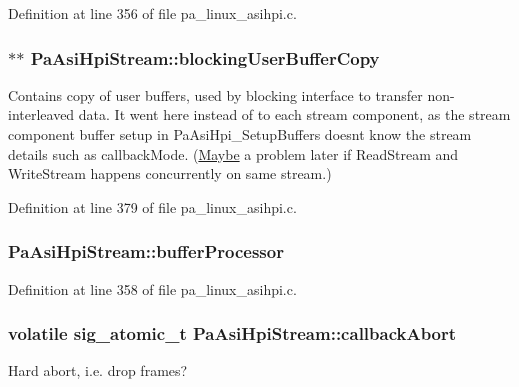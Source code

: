 Definition at line 356 of file pa\+\_\+linux\+\_\+asihpi.\+c.

\subsubsection[{\texorpdfstring{blocking\+User\+Buffer\+Copy}{blockingUserBufferCopy}}]{$\ast$$\ast$ Pa\+Asi\+Hpi\+Stream\+::blocking\+User\+Buffer\+Copy}\hypertarget{struct_pa_asi_hpi_stream_a9950b6297cfa3e55110a4e079606e9e3}{}\label{struct_pa_asi_hpi_stream_a9950b6297cfa3e55110a4e079606e9e3}
Contains copy of user buffers, used by blocking interface to transfer non-\/interleaved data. It went here instead of to each stream component, as the stream component buffer setup in Pa\+Asi\+Hpi\+\_\+\+Setup\+Buffers doesn\textquotesingle{}t know the stream details such as callback\+Mode. (\hyperlink{class_maybe}{Maybe} a problem later if Read\+Stream and Write\+Stream happens concurrently on same stream.) 

Definition at line 379 of file pa\+\_\+linux\+\_\+asihpi.\+c.

\subsubsection[{\texorpdfstring{buffer\+Processor}{bufferProcessor}}]{ Pa\+Asi\+Hpi\+Stream\+::buffer\+Processor}\hypertarget{struct_pa_asi_hpi_stream_a80292f716701b4bd9ba52e27dea4d00c}{}\label{struct_pa_asi_hpi_stream_a80292f716701b4bd9ba52e27dea4d00c}


Definition at line 358 of file pa\+\_\+linux\+\_\+asihpi.\+c.

\subsubsection[{\texorpdfstring{callback\+Abort}{callbackAbort}}]{\setlength{\rightskip}{0pt plus 5cm}volatile sig\+\_\+atomic\+\_\+t Pa\+Asi\+Hpi\+Stream\+::callback\+Abort}\hypertarget{struct_pa_asi_hpi_stream_a3b0ba003d3177d66b4f89a7d8b6ee659}{}\label{struct_pa_asi_hpi_stream_a3b0ba003d3177d66b4f89a7d8b6ee659}
Hard abort, i.\+e. drop frames? 

